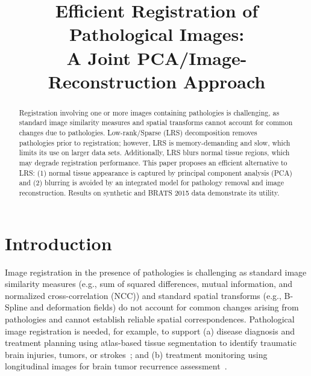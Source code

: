 \documentclass{article}
\title{Efficient Registration of Pathological Images: \\A Joint PCA/Image-Reconstruction Approach}
\begin{document}
%
\maketitle
%
\begin{abstract}
Registration involving one or more images containing pathologies is challenging, as standard image similarity measures and spatial transforms cannot account for common changes due to pathologies. Low-rank/Sparse (LRS) decomposition removes pathologies prior to registration; however, LRS is memory-demanding and slow, which limits its use on larger data sets. Additionally, LRS blurs normal tissue regions, which may degrade registration performance.
This paper proposes an efficient alternative to LRS: (1) normal tissue appearance is captured by principal component analysis (PCA) and (2) blurring is avoided by an integrated model for pathology removal and image reconstruction. Results on synthetic and BRATS 2015 data demonstrate its utility.
\end{abstract}
%
%
\section{Introduction}
\label{section:introduction}

Image registration in the presence of pathologies is challenging as standard image similarity measures (e.g., sum of squared differences, mutual information, and normalized cross-correlation (NCC)) and standard spatial transforms (e.g., B-Spline and deformation fields) do not account for common changes arising from pathologies and cannot establish reliable spatial correspondences. Pathological image registration is needed, for example, to support (a) disease diagnosis and treatment planning using atlas-based tissue segmentation to identify traumatic brain injuries, tumors, or strokes~\cite{Irimia2012}; and (b) treatment monitoring using longitudinal images for brain tumor recurrence assessment~\cite{kwon2014}. 
\end{document}
